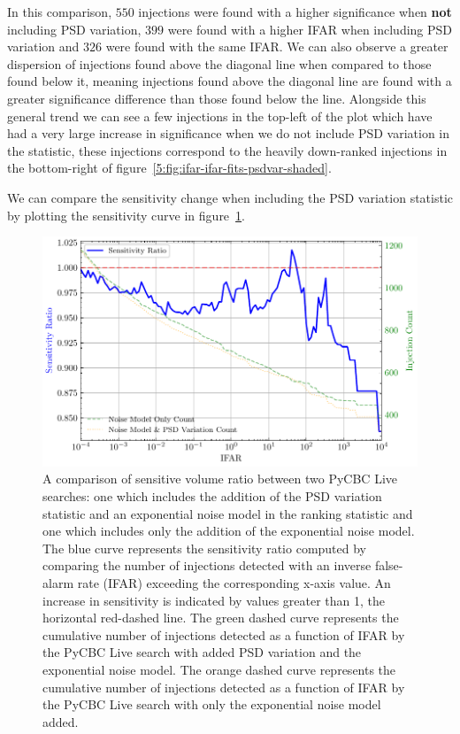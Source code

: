 %
In this comparison, $550$ injections were found with a higher significance when \textbf{not} including PSD variation, $399$ were found with a higher IFAR when including PSD variation and $326$ were found with the same IFAR. We can also observe a greater dispersion of injections found above the diagonal line when compared to those found below it, meaning injections found above the diagonal line are found with a greater significance difference than those found below the line. Alongside this general trend we can see a few injections in the top-left of the plot which have had a very large increase in significance when we do not include PSD variation in the statistic, these injections correspond to the heavily down-ranked injections in the bottom-right of figure~\ref{5:fig:ifar-ifar-fits-psdvar-shaded}.

We can compare the sensitivity change when including the PSD variation statistic by plotting the sensitivity curve in figure~\ref{5:fig:vt-ratio-f-fo}.
%
\begin{figure}
       \centering
    \includegraphics[width=1.0\textwidth]{images/5_pycbclive/fits-only/fits_only_fits_psd_vt_ratio.pdf}
    \caption{A comparison of sensitive volume ratio between two PyCBC Live searches: one which includes the addition of the PSD variation statistic and an exponential noise model in the ranking statistic and one which includes only the addition of the exponential noise model. The blue curve represents the sensitivity ratio computed by comparing the number of injections detected with an inverse false-alarm rate (IFAR) exceeding the corresponding x-axis value. An increase in sensitivity is indicated by values greater than 1, the horizontal red-dashed line. The green dashed curve represents the cumulative number of injections detected as a function of IFAR by the PyCBC Live search with added PSD variation and the exponential noise model. The orange dashed curve represents the cumulative number of injections detected as a function of IFAR by the PyCBC Live search with only the exponential noise model added.}
    \label{5:fig:vt-ratio-f-fo}
\end{figure}
